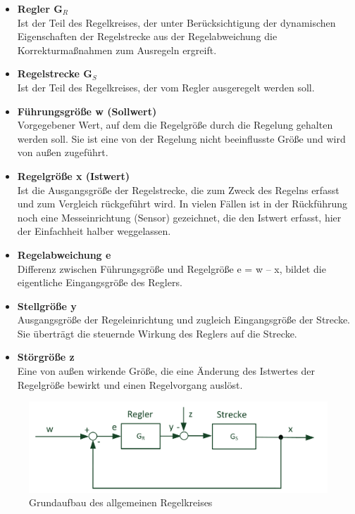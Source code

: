\begin{itemize}
	\item \textbf{Regler G$_R$}
	\\[1mm] Ist der Teil des Regelkreises, der unter Berücksichtigung der dynamischen Eigenschaften der Regelstrecke aus der Regelabweichung die Korrekturmaßnahmen zum Ausregeln ergreift.
	\medskip
	\item \textbf{Regelstrecke G$_S$}
	\\[1mm] Ist der Teil des Regelkreises, der vom Regler ausgeregelt werden soll.
	\medskip
	\item \textbf{Führungsgröße w (Sollwert)}
	\\[1mm] Vorgegebener Wert, auf dem die Regelgröße durch die Regelung gehalten werden soll. Sie ist eine von der Regelung nicht beeinflusste Größe und wird von außen zugeführt.
	\medskip
	\item \textbf{Regelgröße x (Istwert)}
	\\[1mm] Ist die Ausgangsgröße der Regelstrecke, die zum Zweck des Regelns erfasst und zum Vergleich rückgeführt wird. In vielen Fällen ist in der Rückführung noch eine Messeinrichtung (Sensor) gezeichnet, die den Istwert erfasst, hier der Einfachheit halber weggelassen.
	\medskip
	\item \textbf{Regelabweichung e}
	\\[1mm] Differenz zwischen Führungsgröße und Regelgröße e = w – x, bildet die eigentliche Eingangsgröße des Reglers.
	\medskip
	\item \textbf{Stellgröße y}
	\\[1mm] Ausgangsgröße der Regeleinrichtung und zugleich Eingangsgröße der Strecke. Sie überträgt die steuernde Wirkung des Reglers auf die Strecke.
	\medskip
	\item \textbf{Störgröße z}
	\\[1mm] Eine von außen wirkende Größe, die eine Änderung des Istwertes der Regelgröße bewirkt und einen Regelvorgang auslöst.
\end{itemize}

\vspace{5mm}
\begin{figure}[H]
	\begin{center}
		\includegraphics[width=\textwidth]{figures/antrieb/Regelkreis_Grundaufbau.png}
		\caption{Grundaufbau des allgemeinen Regelkreises}
	\end{center}
\end{figure}

